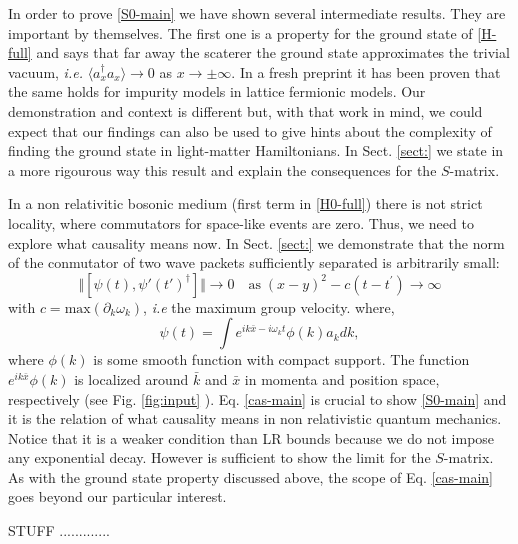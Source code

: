 \documentclass[notitlepage, prx, preprint, amsmath,superscriptaddress,amssymb]{revtex4-1}
\begin{document}
In order to prove \eqref{S0-main}   we have shown several  intermediate results.
They are important by themselves.    The first one is a property for the ground state of \eqref{H-full} and says that far away the scaterer the ground state  approximates the trivial vacuum, \emph{i.e.}  $\langle a_x^\dagger a_x \rangle \to 0$ as $x \to \pm \infty$.  
In a fresh preprint it has been proven that the same holds for impurity models in lattice fermionic models.  Our demonstration and context is  different but, with that work in mind, we could expect that our findings can also be used to give hints about the complexity of finding the ground state in light-matter Hamiltonians.  In Sect. \ref{sect:} we state in a more rigourous way this result and explain the consequences for the $S$-matrix.


In  a non relativitic bosonic medium (first term in \eqref{H0-full}) there is not strict locality, where commutators for space-like events are zero.  Thus, we need to explore what causality means now. In Sect. \ref{sect:}   we demonstrate that the norm of the  conmutator of two wave packets sufficiently separated  is arbitrarily small:
\begin{equation}
\label{cas-main}
\Vert[\psi(t),\psi'(t')^\dagger]\Vert \to 0  \quad
\text{as} \;  (x-y)^2 -c (t-t^\prime) \to \infty
\end{equation}
with $c= \text {max} ( \partial_k \omega_k )$, \emph{i.e} the maximum group velocity.  where,
\begin{equation}
\label{wp}
\psi(t) = \int  e^{ik\bar x-i\omega_kt} \phi(k) a_k dk,
\end{equation}
where $\phi(k)$ is some smooth function with compact support. The function $e^{ik\bar x} \phi(k)$ is localized around $\bar k$ and $\bar x$ in momenta and position space, respectively  (see Fig. \ref{fig:input} ).
Eq. \eqref{cas-main} is crucial to show \eqref{S0-main} and it is the relation of what causality means in non relativistic quantum mechanics.  Notice that it is a weaker condition than LR bounds because we do not impose any exponential decay.  However is sufficient to show the limit for the $S$-matrix.  As with the ground state property discussed above,  the scope of  Eq. \eqref{cas-main} goes beyond  our particular interest.




 STUFF .............
\end{document}
